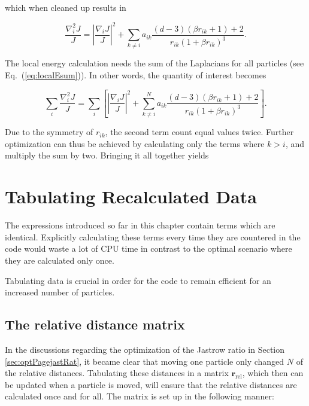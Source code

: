 which when cleaned up results in

\begin{equation}
 \frac{\nabla^2_i J}{J} = \left| \frac{\nabla_i J}{J}\right|^2 + \sum_{k \ne i} a_{ik}\frac{(d-3)(\beta r_{ik} + 1) + 2}{r_{ik}(1 + \beta r_{ik})^3}.
\end{equation}

The local energy calculation needs the sum of the Laplacians for all particles (see Eq.~(\ref{eq:localEsum})). In other words, the quantity of interest becomes

\begin{equation}
 \sum_i \frac{\nabla^2_i J}{J} = \sum_i \left[\left|\frac{\nabla_i J}{J}\right|^2 + \sum_{k \ne i}^N a_{ik}\frac{(d-3)(\beta r_{ik} + 1) + 2}{r_{ik}(1 + \beta r_{ik})^3}\right].
\end{equation}

Due to the symmetry of $r_{ik}$, the second term count equal values twice. Further optimization can thus be achieved by calculating only the terms where $k>i$, and multiply the sum by two. Bringing it all together yields



\section{Tabulating Recalculated Data}

The expressions introduced so far in this chapter contain terms which are identical. Explicitly calculating these terms every time they are countered in the code would waste a lot of CPU time in contrast to the optimal scenario where they are calculated only once.

Tabulating data is crucial in order for the code to remain efficient for an increased number of particles. 

\subsection{The relative distance matrix}
\label{sec:relDist}

In the discussions regarding the optimization of the Jastrow ratio in Section \ref{sec:optPagejastRat}, it became clear that moving one particle only changed $N$ of the relative distances. Tabulating these distances in a matrix $\mathbf{r}_\mathrm{rel}$, which then can be updated when a particle is moved, will ensure that the relative distances are calculated once and for all. The matrix is set up in the following manner:

